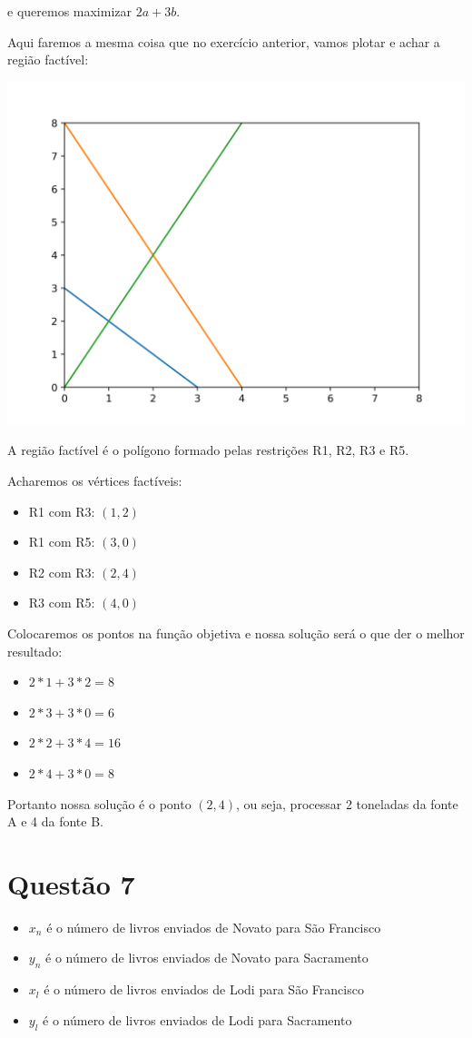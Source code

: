 \documentclass[11pt]{article}
\begin{document}
e queremos maximizar \(2a+3b\).

Aqui faremos a mesma coisa que no exercício anterior, vamos plotar e achar a região factível:

\begin{center}
\includegraphics[width=.9\linewidth]{q6.png}
\end{center}

A região factível é o polígono formado pelas restrições R1, R2, R3 e R5.

Acharemos os vértices factíveis:
\begin{itemize}
\item R1 com R3: \((1, 2)\)
\item R1 com R5: \((3, 0)\)
\item R2 com R3: \((2, 4)\)
\item R3 com R5: \((4, 0)\)
\end{itemize}

Colocaremos os pontos na função objetiva e nossa solução será o que der o melhor resultado:
\begin{itemize}
\item \(2*1 + 3*2 = 8\)
\item \(2*3 + 3*0 = 6\)
\item \(2*2 + 3*4 = 16\)
\item \(2*4 + 3*0 = 8\)
\end{itemize}

Portanto nossa solução é o ponto \((2, 4)\), ou seja, processar 2 toneladas da fonte A e 4 da fonte B.
\section{Questão 7}
\label{sec:org1fd7f43}
\begin{itemize}
\item \(x_n\) é o número de livros enviados de Novato para São Francisco
\item \(y_n\) é o número de livros enviados de Novato para Sacramento
\item \(x_l\) é o número de livros enviados de Lodi para São Francisco
\item \(y_l\) é o número de livros enviados de Lodi para Sacramento
\end{itemize}
\end{document}
